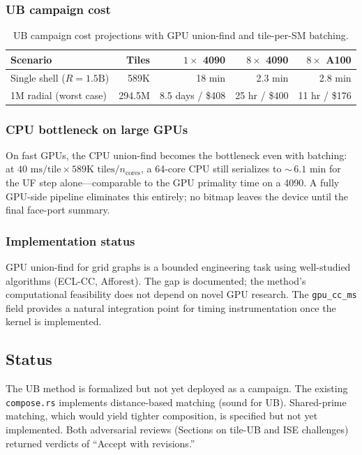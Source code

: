 \documentclass[11pt,a4paper]{article}
\theoremstyle{definition}
\theoremstyle{plain}
\theoremstyle{remark}
\begin{document}
\subsubsection{UB campaign cost}

\begin{table}[ht]
\centering
\begin{tabular}{@{}lrrrr@{}}
\toprule
Scenario & Tiles & $1\times$ 4090 & $8\times$ 4090 & $8\times$ A100 \\
\midrule
Single shell ($R = 1.5\text{B}$) & 589K & 18 min & 2.3 min & 2.8 min \\
1M radial (worst case) & 294.5M & 8.5 days / \$408 & 25 hr / \$400 & 11 hr / \$176 \\
\bottomrule
\end{tabular}
\caption{UB campaign cost projections with GPU union-find and tile-per-SM batching.}
\label{tab:ub-campaign-cost}
\end{table}

\subsubsection{CPU bottleneck on large GPUs}

On fast GPUs, the CPU union-find becomes the bottleneck even with batching: at $40\text{ ms/tile} \times 589\text{K tiles} / n_{\text{cores}}$, a 64-core CPU still serializes to ${\sim}\,6.1\text{ min}$ for the UF step alone---comparable to the GPU primality time on a 4090.  A fully GPU-side pipeline eliminates this entirely; no bitmap leaves the device until the final face-port summary.

\subsubsection{Implementation status}

GPU union-find for grid graphs is a bounded engineering task using well-studied algorithms (ECL-CC, Afforest).  The gap is documented; the method's computational feasibility does not depend on novel GPU research.  The \texttt{gpu\_cc\_ms} field provides a natural integration point for timing instrumentation once the kernel is implemented.

\subsection{Status}

The UB method is formalized but not yet deployed as a campaign.  The existing \texttt{compose.rs} implements distance-based matching (sound for UB).  Shared-prime matching, which would yield tighter composition, is specified but not yet implemented.  Both adversarial reviews (Sections on tile-UB and ISE challenges) returned verdicts of ``Accept with revisions.''
\end{document}
